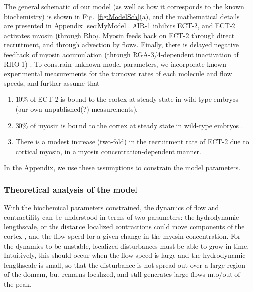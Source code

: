 \documentclass[11pt]{article}
\begin{document}
The general schematic of our model (as well as how it corresponds to the known biochemistry) is shown in Fig.\ \ref{fig:ModelSch}(a), and the mathematical details are presented in Appendix \ref{sec:MyModel}. AIR-1 inhibits ECT-2, and ECT-2 activates myosin (through Rho). Myosin feeds back on ECT-2 through direct recruitment, and through advection by flows. Finally, there is delayed negative feedback of myosin accumulation (through RGA-3/4-dependent inactivation of RHO-1) \citep{michaux2018excitable}. To constrain unknown model parameters, we incorporate known experimental measurements for the turnover rates of each molecule and flow speeds, and further assume that 
\begin{enumerate}
\item 10\% of ECT-2 is bound to the cortex at steady state in wild-type embryos (our own unpublished(?) measurements). 
\item 30\% of myosin is bound to the cortex at steady state in wild-type embryos \citep[Fig.~S3j]{gross2019guiding}.
\item There is a modest increase (two-fold) in the recruitment rate of ECT-2 due to cortical myosin, in a myosin concentration-dependent manner.
\end{enumerate}
In the Appendix, we use these assumptions to constrain the model parameters. %

\subsubsection{Theoretical analysis of the model}
With the biochemical parameters constrained, the dynamics of flow and contractility can be understood in terms of two parameters: the hydrodynamic lengthscale, or the distance localized contractions could move components of the cortex \citep{mayer2010anisotropies}, and the flow speed for a given change in the myosin concentration. For the dynamics to be unstable, localized disturbances must be able to grow in time. Intuitively, this should occur when the flow speed is large and the hydrodynamic lengthscale is small, so that the disturbance is not spread out over a large region of the domain, but remains localized, and still generates large flows into/out of the peak.
\end{document}
